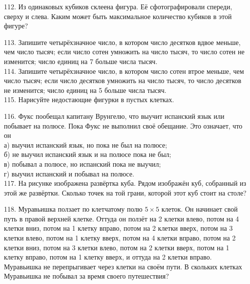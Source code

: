 112. Из одинаковых кубиков склеена фигура. Её сфотографировали спереди, сверху и слева. Каким может быть максимальное количество кубиков в этой фигуре?
\begin{center}
\begin{figure}[ht!]
\end{figure}
\end{center}
113. Запишите четырёхзначное число, в котором число десятков вдвое меньше, чем число тысяч; если число сотен умножить на число тысяч, то число сотен не изменится; число единиц на 7 больше числа тысяч.\\
114. Запишите четырёхзначное число, в котором число сотен втрое меньше, чем число тысяч; если число десятков умножить на число тысяч, то число десятков не изменится; число единиц на 5 больше числа тысяч.\\
115. Нарисуйте недостающие фигурки в пустых клетках.
\begin{center}
\begin{figure}[ht!]
\end{figure}
\end{center}
116. Фукс пообещал капитану Врунгелю, что выучит испанский язык или побывает на полюсе. Пока Фукс не выполнил своё обещание. Это означает, что он\\
а) выучил испанский язык, но пока не был на полюсе;\\
б) не выучил испанский язык и на полюсе пока не был;\\
в) побывал а полюсе, но испанский пока не выучил;\\
г) выучил испанский и побывал на полюсе.\\
117. На рисунке изображена развёртка куба. Рядом изображён куб, собранный из этой же развёртки. Сколько точек на той грани, которой этот куб стоит на столе?
\begin{center}
\begin{figure}[ht!]
\end{figure}
\end{center}
118. Муравьишка ползает по клетчатому полю $5\times5$ клеток. Он начинает свой путь в правой верхней клетке. Оттуда он ползёт на 2 клетки влево, потом на 4 клетки вниз, потом на 1 клетку вправо, потом на 2 клетки вверх, потом на 3 клетки влево, потом на 1 клетку вверх, потом на 4 клетки вправо, потом на 2 клетки вниз, потом на 3 клетки влево, потом на 2 клетки вверх, потом на 1 клетку вправо, потом на 1 клетку вверх, и оттуда на 2 клетки вправо. Муравьишка не перепрыгивает через клетки на своём пути. В скольких клетках Муравьишка не побывал за время своего путешествия?\\
